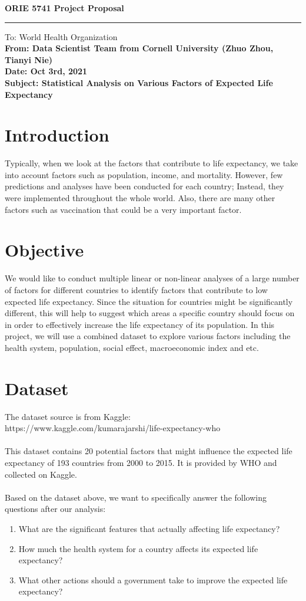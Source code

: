 \documentclass[12pt]{article}
\newcommand{\header}[2]{
\begin{center}
		\Large{#1}
		\rule{\linewidth}{1pt}
		\normalsize{#2}
\end{center}
}
\begin{document}
\header{\bf ORIE 5741 Project Proposal}

\bf To: World Health Organization\\
\bf From: Data Scientist Team from Cornell University (Zhuo Zhou, Tianyi Nie)\\
\bf Date: Oct 3rd, 2021\\
\bf Subject: Statistical Analysis on Various Factors of Expected Life Expectancy




\section{Introduction}
Typically, when we look at the factors that contribute to life expectancy, we take into account factors such as population, income, and mortality. However, few predictions and analyses have been conducted for each country; Instead, they were implemented throughout the whole world. Also, there are many other factors such as vaccination that could be a very important factor. 

\section{Objective}
We would like to conduct multiple linear or non-linear analyses of a large number of factors for different countries to identify factors that contribute to low expected life expectancy. Since the situation for countries might be significantly different, this will help to suggest which areas a specific country should focus on in order to effectively increase the life expectancy of its population. In this project, we will use a combined dataset to explore various factors including the health system, population, social effect, macroeconomic index and etc.

\section{Dataset}
The dataset source is from Kaggle:
\\https://www.kaggle.com/kumarajarshi/life-expectancy-who
\\ \\
This dataset contains 20 potential factors that might influence the expected life expectancy of 193 countries from 2000 to 2015. It is provided by WHO and collected on Kaggle. 
\\ \\
Based on the dataset above, we want to specifically answer the following questions after our analysis: 
    \begin{enumerate}
        \item What are the significant features that actually affecting life expectancy?
        \item How much the health system for a country affects its expected life expectancy?
        \item What other actions should a government take to improve the expected life expectancy?

    \end{enumerate} 
\end{document}
